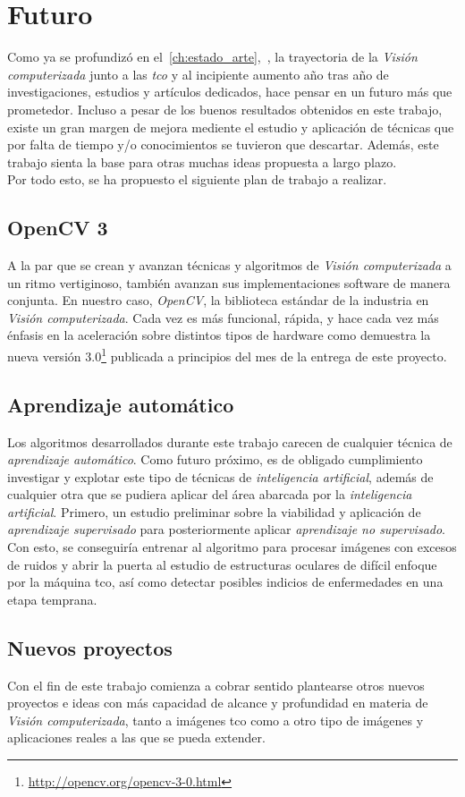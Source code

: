 \chapter{Futuro}
Como ya se profundizó en
el~\autoref{ch:estado_arte},~, la trayectoria
de la \emph{Visión computerizada} junto a las \emph{\gls{tco}} y al
incipiente aumento año tras año de investigaciones, estudios y
artículos dedicados, hace pensar en un futuro más que
prometedor. Incluso a pesar de los buenos resultados obtenidos en este
trabajo, existe un gran margen de mejora mediente el estudio y
aplicación de técnicas que por falta de tiempo y/o conocimientos se
tuvieron que descartar. Además, este trabajo sienta la base para otras
muchas ideas propuesta a largo plazo.\\
Por todo esto, se ha propuesto el siguiente plan de trabajo a
realizar.

\section{OpenCV 3}
A la par que se crean y avanzan técnicas y algoritmos de \emph{Visión
  computerizada} a un ritmo vertiginoso, también avanzan sus
implementaciones software de manera conjunta. En nuestro caso,
\emph{OpenCV}, la biblioteca estándar de la industria en \emph{Visión
  computerizada}. Cada vez es más funcional, rápida, y hace cada vez
más énfasis en la aceleración sobre distintos tipos de hardware
como demuestra la nueva versión
$3.0$\footnote{\url{http://opencv.org/opencv-3-0.html}} publicada a
principios del mes de la entrega de este proyecto.

\section{Aprendizaje automático}
Los algoritmos desarrollados durante este trabajo carecen de cualquier
técnica de \emph{aprendizaje automático}. Como futuro próximo, es de
obligado cumplimiento investigar y explotar este tipo de técnicas de
\emph{inteligencia artificial}, además de cualquier otra que se pudiera
aplicar del área abarcada por la \emph{inteligencia
  artificial}. Primero, un estudio preliminar sobre la viabilidad y
aplicación de \emph{aprendizaje supervisado} para posteriormente
aplicar \emph{aprendizaje no supervisado}. Con esto, se conseguiría
entrenar al algoritmo para procesar imágenes con excesos de ruidos y
abrir la puerta al estudio de estructuras oculares de difícil enfoque
por la máquina \gls{tco}, así como detectar posibles indicios de 
enfermedades en una etapa temprana.

\section{Nuevos proyectos}
Con el fin de este trabajo comienza a cobrar sentido plantearse otros
nuevos proyectos e ideas con más capacidad de alcance y profundidad en
materia de \emph{Visión computerizada}, tanto a imágenes \gls{tco} como
a otro tipo de imágenes y aplicaciones reales a las que se pueda extender.
